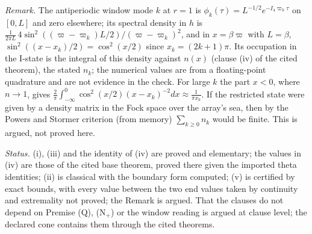 \emph{Remark.} The antiperiodic window mode $k$ at $r = 1$ is $\phi_{k}(\tau) = L^{-1/2}e^{-I_4\varpi_{k}\tau}$ on $[0, L]$ and zero elsewhere; its spectral density in $h$ is $\tfrac{1}{2\pi L}\,4\sin^{2}((\varpi - \varpi_{k})L/2)/(\varpi - \varpi_{k})^{2}$, and in $x = \beta\varpi$ with $L = \beta$, $\sin^{2}((x - x_{k})/2) = \cos^{2}(x/2)$ since $x_{k} = (2k + 1)\pi$. Its occupation in the I-state is the integral of this density against $n(x)$ (clause (iv) of the cited theorem), the stated $n_{k}$; the numerical values are from a floating-point quadrature and are not evidence in the check. For large $k$ the part $x < 0$, where $n \to 1$, gives $\tfrac{2}{\pi}\int_{-\infty}^{0}\cos^{2}(x/2)(x - x_{k})^{-2}dx \approx \tfrac{1}{\pi x_{k}}$. If the restricted state were given by a density matrix in the Fock space over the array's sea, then by the Powers and Stormer criterion (from memory) $\sum_{k \ge 0}n_{k}$ would be finite. This is argued, not proved here.

\emph{Status.} (i), (iii) and the identity of (iv) are proved and elementary; the values in (iv) are those of the cited base theorem, proved there given the imported theta identities; (ii) is classical with the boundary form computed; (v) is certified by exact bounds, with every value between the two end values taken by continuity and extremality not proved; the Remark is argued. That the clauses do not depend on Premise (Q), (N$_{+}$) or the window reading is argued at clause level; the declared cone contains them through the cited theorems.
